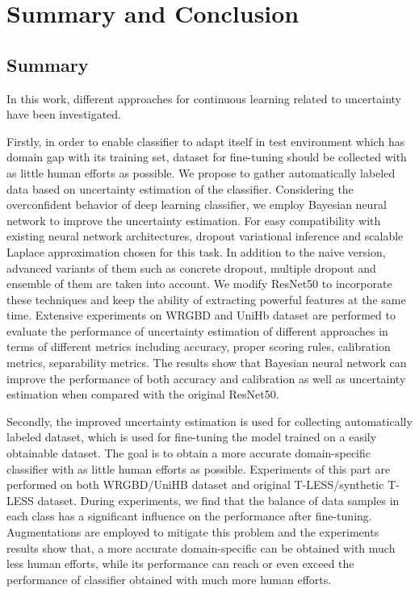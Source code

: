 \chapter{Summary and Conclusion}
\section{Summary}
In this work, different approaches for continuous learning related to uncertainty have been investigated.
 
Firstly, in order to enable classifier to adapt itself in test environment which has domain gap with its training set, dataset for fine-tuning should be collected with as little human efforts as possible. We propose to gather automatically labeled data based on uncertainty estimation of the classifier. Considering the overconfident behavior of deep learning classifier, we employ Bayesian neural network to improve the uncertainty estimation. For easy compatibility with existing neural network architectures, dropout variational inference and scalable Laplace approximation chosen for this task. In addition to the naive version, advanced variants of them such as concrete dropout, multiple dropout and ensemble of them are taken into account. We modify ResNet50 to incorporate these techniques and keep the ability of extracting powerful features at the same time. Extensive experiments on WRGBD and UniHb dataset are performed to evaluate the performance of uncertainty estimation of different approaches in terms of different metrics including accuracy, proper scoring rules, calibration metrics, separability metrics. The results show that Bayesian neural network can improve the performance of both accuracy and calibration as well as uncertainty estimation when compared with the original ResNet50. 

Secondly, the improved uncertainty estimation is used for collecting automatically labeled dataset, which is used for fine-tuning the model trained on a easily obtainable dataset. The goal is to obtain a more accurate domain-specific classifier with as little human efforts as possible. Experiments of this part are performed on both WRGBD/UniHB dataset and original T-LESS/synthetic T-LESS dataset. During experiments, we find that the balance of data samples in each class has a significant influence on the performance after fine-tuning. Augmentations are employed to mitigate this problem and the experiments results show that, a more accurate domain-specific can be obtained with much less human efforts, while its performance can reach or even exceed the performance of classifier obtained with much more human efforts.

